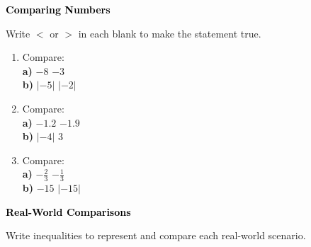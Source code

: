 \documentclass[12pt, letterpaper, fleqn]{article}
\newcommand{\blankshorter}{\underline{\hspace{1.5cm}}}
\begin{document}
\newpage

\begin{tcolorbox}[colback=black!10]
\large\textcolor{black}{\textbf{Comparing Numbers}}
\end{tcolorbox}

\noindent
Write $<$ or $>$ in each blank to make the statement true.

\vspace{3mm}

\begin{enumerate}[itemsep=2.2cm, leftmargin=0.6cm]

\item Compare: \\
\textbf{a)} $-8$ \quad \blankshorter \quad $-3$ \\
\textbf{b)} $|-5|$ \quad \blankshorter \quad $|-2|$

\vspace{2cm}

\item Compare: \\
\textbf{a)} $-1.2$ \quad \blankshorter \quad $-1.9$ \\
\textbf{b)} $|-4|$ \quad \blankshorter \quad $3$

\vspace{2cm}

\item Compare: \\
\textbf{a)} $-\frac{2}{3}$ \quad \blankshorter \quad $-\frac{1}{3}$ \\
\textbf{b)} $-15$ \quad \blankshorter \quad $|-15|$

\vspace{2cm}

\end{enumerate}

\newpage

\begin{tcolorbox}[colback=black!10]
\large\textcolor{black}{\textbf{Real-World Comparisons}}
\end{tcolorbox}

\noindent
Write inequalities to represent and compare each real-world scenario.

\vspace{3mm}
\end{document}

